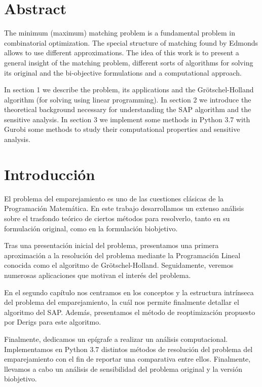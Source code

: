 \documentclass[twoside,a4paper,openright,12pt,tikz]{book}
\begin{document}
\newpage
\thispagestyle{empty}

\tableofcontents
\newpage
\thispagestyle{empty}

\chapter*{Abstract}
The minimum (maximum) matching problem is a fundamental problem in combinatorial optimization. The special structure of matching found by Edmonds allows to use different approximations. The idea of this work is to present a general insight of the matching problem, different sorts of algorithms for solving its original and the bi-objective formulations and a computational approach. 

In section 1 we describe the problem, its applications and the Grötschel-Holland algorithm (for solving using linear programming). In section 2 we introduce the theoretical background necessary for understanding the SAP algorithm and the sensitive analysis. In section 3 we implement some methods in Python 3.7 with Gurobi some methods to study their computational properties and sensitive analysis.
\newpage
\thispagestyle{empty}

\chapter*{Introducci\'on}\label{cap.introduccion}
El problema del emparejamiento es uno de las cuestiones clásicas de la Programación Matemática. En este trabajo desarrollamos un extenso análisis sobre el trasfondo teórico de ciertos métodos para resolverlo, tanto en su formulación original, como en la formulación biobjetivo.

Tras una presentación inicial del problema, presentamos una primera aproximación a la resolución del problema mediante la Programación Lineal conocida como el algoritmo de Grötschel-Holland. Seguidamente, veremos numerosas aplicaciones que motivan el interés del problema.

En el segundo capítulo nos centramos en los conceptos y la estructura intrínseca del problema del emparejamiento, la cuál nos permite finalmente detallar el algoritmo del SAP. Además, presentamos el método de reoptimización propuesto por Derigs para este algoritmo.

Finalmente, dedicamos un epígrafe a realizar un análisis computacional. Implementamos en Python 3.7 distintos métodos de resolución del problema del emparejamiento con el fin de reportar una comparativa entre ellos. Finalmente, llevamos a cabo un análisis de sensibilidad del problema original y la versión biobjetivo.
\newpage
\thispagestyle{empty}
\end{document}
